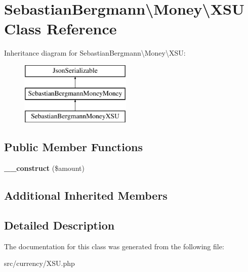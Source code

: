 \hypertarget{classSebastianBergmann_1_1Money_1_1XSU}{}\section{Sebastian\+Bergmann\textbackslash{}Money\textbackslash{}X\+S\+U Class Reference}
\label{classSebastianBergmann_1_1Money_1_1XSU}
Inheritance diagram for Sebastian\+Bergmann\textbackslash{}Money\textbackslash{}X\+S\+U\+:\begin{figure}[H]
\begin{center}
\leavevmode
\includegraphics[height=3.000000cm]{classSebastianBergmann_1_1Money_1_1XSU}
\end{center}
\end{figure}
\subsection*{Public Member Functions}
\begin{DoxyCompactItemize}
\item 
\hypertarget{classSebastianBergmann_1_1Money_1_1XSU_a7b9e36c7a2ca635d3626474aeae49a6a}{}{\bfseries \+\_\+\+\_\+construct} (\$amount)\label{classSebastianBergmann_1_1Money_1_1XSU_a7b9e36c7a2ca635d3626474aeae49a6a}

\end{DoxyCompactItemize}
\subsection*{Additional Inherited Members}


\subsection{Detailed Description}


The documentation for this class was generated from the following file\+:\begin{DoxyCompactItemize}
\item 
src/currency/X\+S\+U.\+php\end{DoxyCompactItemize}
